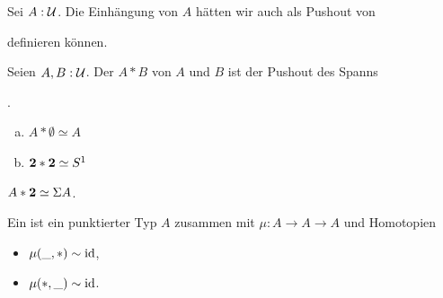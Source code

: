 \begin{beweis}
\end{beweis}

\begin{bemerkung}
Sei \(A:\mathcal{U}\).
  Die Einhängung von \(A\) hätten wir auch als Pushout von
definieren können.
\end{bemerkung}

\begin{definition}
  Seien \(A,B:\mathcal{U}\).
  Der  \(A\ast B\) von \(A\) und \(B\) ist der Pushout des Spanns
.
\end{definition}

\begin{beispiel}
\begin{enumerate}[(a)]
\item \(A\ast\emptyset\simeq A\)
\item \(\mathbf{2}\ast\mathbf{2}\simeq S^1\)
\end{enumerate}
\end{beispiel}

\begin{lemma}
  \(A\ast\mathbf{2}\simeq \Sigma A\).
\end{lemma}

\begin{beweis}
\end{beweis}

\begin{definition}
  Ein  ist ein punktierter Typ \(A\) zusammen mit \(\mu:A\to A\to A\)
  und Homotopien
  \begin{itemize}
  \item \(\mu(\_,\ast)\sim\mathrm{id} \),
  \item \(\mu(\ast,\_)\sim\mathrm{id} \).
  \end{itemize}
\end{definition}

